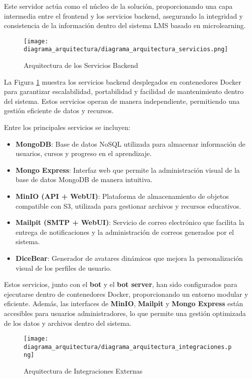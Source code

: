 Este servidor actúa como el núcleo de la solución, proporcionando una capa
intermedia entre el frontend y los servicios backend, asegurando la integridad y
consistencia de la información dentro del sistema LMS basado en microlearning.

\begin{figure}[H]
    \centering
    \texttt{[image: diagrama\_arquitectura/diagrama\_arquitectura\_servicios.png]}
    \caption{Arquitectura de los Servicios Backend}
    \label{fig:diagrama_arquitectura_servicios}
\end{figure}

La Figura \ref{fig:diagrama_arquitectura_servicios} muestra los servicios
backend desplegados en contenedores Docker para garantizar escalabilidad, portabilidad y
facilidad de mantenimiento dentro del sistema. Estos servicios operan de manera
independiente, permitiendo una gestión eficiente de datos y recursos.

Entre los principales servicios se incluyen:
\begin{itemize}
    \item \textbf{MongoDB}: Base de datos NoSQL utilizada para almacenar
    información de usuarios, cursos y progreso en el aprendizaje.
    \item \textbf{Mongo Express}: Interfaz web que permite la administración
    visual de la base de datos MongoDB de manera intuitiva.
    \item \textbf{MinIO (API + WebUI)}: Plataforma de almacenamiento de objetos
    compatible con S3, utilizada para gestionar archivos y recursos educativos.
    \item \textbf{Mailpit (SMTP + WebUI)}: Servicio de correo electrónico que
    facilita la entrega de notificaciones y la administración de correos
    generados por el sistema.
    \item \textbf{DiceBear}: Generador de avatares dinámicos que mejora la
    personalización visual de los perfiles de usuario.
\end{itemize}

Estos servicios, junto con el \textbf{bot} y el \textbf{bot server}, han sido
configurados para ejecutarse dentro de contenedores Docker, proporcionando un
entorno modular y eficiente. Además, las interfaces de \textbf{MinIO},
\textbf{Mailpit} y \textbf{Mongo Express} están accesibles para usuarios
administradores, lo que permite una gestión optimizada de los datos y archivos
dentro del sistema.

\begin{figure}[H]
    \centering
    \texttt{[image: diagrama\_arquitectura/diagrama\_arquitectura\_integraciones.png]}
    \caption{Arquitectura de Integraciones Externas}
    \label{fig:diagrama_arquitectura_integraciones}
\end{figure}

